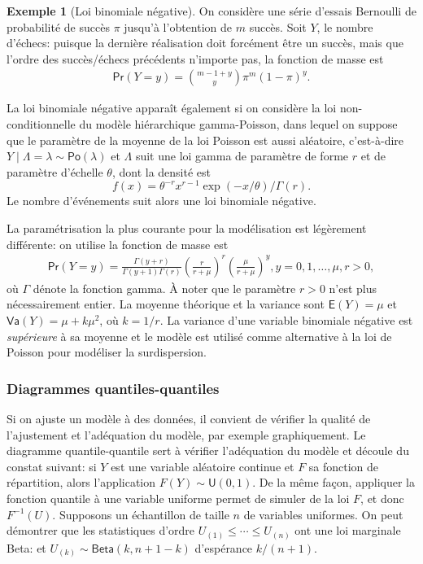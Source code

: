 \documentclass[
  11pt,
  letterpaper,
]{article}
\theoremstyle{definition}
\theoremstyle{definition}
\newtheorem{example}{Exemple}[section]
\theoremstyle{definition}
\theoremstyle{remark}
\begin{document}
\begin{example}[Loi binomiale négative]
\protect\hypertarget{exm:loibinneg}{}{\label{exm:loibinneg} {} }On considère une série d'essais Bernoulli de probabilité de succès \(\pi\) jusqu'à l'obtention de \(m\) succès. Soit \(Y\), le nombre d'échecs: puisque la dernière réalisation doit forcément être un succès, mais que l'ordre des succès/échecs précédents n'importe pas, la fonction de masse est
\begin{align*}
\mathsf{Pr}(Y=y)= \binom{m-1+y}{y} \pi^m (1-\pi)^{y}.
\end{align*}

La loi binomiale négative apparaît également si on considère la loi non-conditionnelle du modèle hiérarchique gamma-Poisson, dans lequel on suppose que le paramètre de la moyenne de la loi Poisson est aussi aléatoire, c'est-à-dire \(Y \mid \Lambda=\lambda \sim \mathsf{Po}(\lambda)\) et \(\Lambda\) suit une loi gamma de paramètre de forme \(r\) et de paramètre d'échelle \(\theta\), dont la densité est \[f(x) = \theta^{-r}x^{r-1}\exp(-x/\theta)/\Gamma(r).\] Le nombre d'événements suit alors une loi binomiale négative.

La paramétrisation la plus courante pour la modélisation est légèrement différente: on utilise la fonction de masse est
\begin{align*}
\mathsf{Pr}(Y=y)=\frac{\Gamma(y+r)}{\Gamma(y+1)\Gamma(r)} \left(\frac{r}{r + \mu} \right)^{r} \left(\frac{\mu}{r+\mu}\right)^y, y=0, 1, \ldots, \mu,r >0,
\end{align*}
où \(\Gamma\) dénote la fonction gamma. À noter que le paramètre \(r>0\) n'est plus nécessairement entier. La moyenne théorique et la variance sont
\(\mathsf{E}(Y)=\mu\) et \(\mathsf{Va}(Y)=\mu+k\mu^2\), où \(k=1/r\). La variance d'une variable binomiale négative est \emph{supérieure} à sa moyenne et le modèle est utilisé comme alternative à la loi de Poisson pour modéliser la surdispersion.
\end{example}

\hypertarget{diagramme-qq}{%
\subsubsection{Diagrammes quantiles-quantiles}\label{diagramme-qq}}

Si on ajuste un modèle à des données, il convient de vérifier la qualité de l'ajustement et l'adéquation du modèle, par exemple graphiquement. Le diagramme quantile-quantile sert à vérifier l'adéquation du modèle et découle du constat suivant: si \(Y\) est une variable aléatoire continue et \(F\) sa fonction de répartition, alors l'application \(F(Y) \sim \mathsf{U}(0,1)\). De la même façon, appliquer la fonction quantile à une variable uniforme permet de simuler de la loi \(F\), et donc \(F^{-1}(U)\). Supposons un échantillon de taille \(n\) de variables uniformes. On peut démontrer que les statistiques d'ordre \(U_{(1)} \leq \cdots \leq U_{(n)}\) ont une loi marginale Beta: et \(U_{(k)} \sim \mathsf{Beta}(k, n+1-k)\) d'espérance \(k/(n+1)\).
\end{document}
